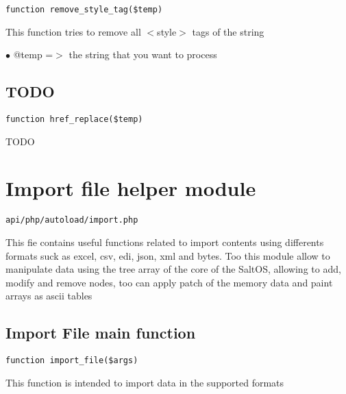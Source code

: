 \documentclass[a4paper]{book}
\begin{document}
\begin{lstlisting}
function remove_style_tag($temp)
\end{lstlisting}

This function tries to remove all $<$style$>$ tags of the string

\begin{compactitem}
\item[\color{myblue}$\bullet$] @temp =$>$ the string that you want to process
\end{compactitem}

\hypertarget{toc150}{}
\subsection{TODO}

\begin{lstlisting}
function href_replace($temp)
\end{lstlisting}

TODO

\hypertarget{toc151}{}
\section{Import file helper module}

\begin{lstlisting}
api/php/autoload/import.php
\end{lstlisting}

This fie contains useful functions related to import contents using differents formats suck as
excel, csv, edi, json, xml and bytes. Too this module allow to manipulate data using the tree
array of the core of the SaltOS, allowing to add, modify and remove nodes, too can apply patch
of the memory data and paint arrays as ascii tables

\hypertarget{toc152}{}
\subsection{Import File main function}

\begin{lstlisting}
function import_file($args)
\end{lstlisting}

This function is intended to import data in the supported formats
\end{document}
